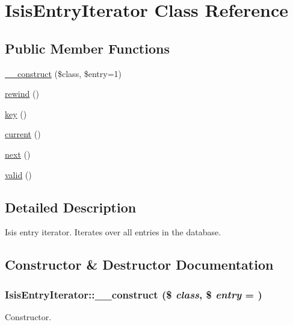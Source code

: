 \hypertarget{classIsisEntryIterator}{
\section{IsisEntryIterator Class Reference}
\label{classIsisEntryIterator}
}
\subsection*{Public Member Functions}
\begin{DoxyCompactItemize}
\item 
\hyperlink{classIsisEntryIterator_a056fcc7d817523faf1fb033fa9f8ad6e}{\_\-\_\-construct} (\$class, \$entry=1)
\item 
\hyperlink{classIsisEntryIterator_a985e88cdfb69b42e3389f24c08b2404a}{rewind} ()
\item 
\hyperlink{classIsisEntryIterator_a4a740dacedb86023ece4561092c33a65}{key} ()
\item 
\hyperlink{classIsisEntryIterator_ac482f43403fc4d2e1b620fb4e0f6797f}{current} ()
\item 
\hyperlink{classIsisEntryIterator_a2d1d0fe5d3c22d1720e93e03952b877d}{next} ()
\item 
\hyperlink{classIsisEntryIterator_aff9e54b112cc728b7cd6cf00c0359c49}{valid} ()
\end{DoxyCompactItemize}


\subsection{Detailed Description}
Isis entry iterator. Iterates over all entries in the database. 

\subsection{Constructor \& Destructor Documentation}
\hypertarget{classIsisEntryIterator_a056fcc7d817523faf1fb033fa9f8ad6e}{
\subsubsection[{\_\-\_\-construct}]{\setlength{\rightskip}{0pt plus 5cm}IsisEntryIterator::\_\-\_\-construct (\$ {\em class}, \/  \$ {\em entry} = {})}}
\label{classIsisEntryIterator_a056fcc7d817523faf1fb033fa9f8ad6e}
Constructor.


